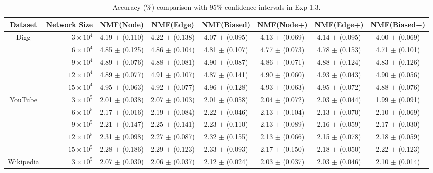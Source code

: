 \documentclass[10pt,journal,compsoc]{IEEEtran}
\newcommand{\Node}{{\sf NMF(Node)}\xspace}
\newcommand{\Edge}{{\sf NMF(Edge)}\xspace}
\newcommand{\Biased}{{\sf NMF(Biased)}\xspace}
\newcommand{\Digg}{{\sf Digg}\xspace}
\newcommand{\YouTube}{{\sf YouTube}\xspace}
\newcommand{\Wikipedia}{{\sf Wikipedia}\xspace}
\newcommand{\Nodep}{{\sf NMF(Node+)}\xspace}
\newcommand{\Edgep}{{\sf NMF(Edge+)}\xspace}
\newcommand{\Biasedp}{{\sf NMF(Biased+)}\xspace}
\begin{document}
\begin{table}
\caption{Accuracy (\%) comparison with 95\% confidence intervals in Exp-1.3.}
\label{tab_accuracy_2}
\vspace{-2ex}
\centering
\newcommand{\tabincell}[2]{\begin{tabular}{@{}#1@{}}#2\end{tabular}}
\begin{tabular}{c|r|c|c|c|c|c|c}
\hline \hline Dataset  & Network Size &  \Node & \Edge & \Biased & \Nodep & \Edgep & \Biasedp   \\
\hline
\multirow{5}{*}{\Digg}
 & $3 \times 10^4 $ & 4.19 $\pm$ (0.110) & 4.22 $\pm$ (0.138) & 4.07 $\pm$ (0.095) & 4.13 $\pm$ (0.069) & 4.14 $\pm$ (0.095) & 4.00 $\pm$ (0.069) \\
 & $6 \times 10^4 $ & 4.85 $\pm$ (0.125) & 4.86 $\pm$ (0.104) & 4.81 $\pm$ (0.107) & 4.77 $\pm$ (0.073) & 4.78 $\pm$ (0.153) & 4.71 $\pm$ (0.101)  \\
 & $9 \times 10^4 $ & 4.89 $\pm$ (0.076) & 4.88 $\pm$ (0.081) & 4.90 $\pm$ (0.087) & 4.86 $\pm$ (0.071) & 4.88 $\pm$ (0.124) & 4.83 $\pm$ (0.126)  \\
 & $12 \times 10^4 $ & 4.89 $\pm$ (0.077) & 4.91 $\pm$ (0.107) & 4.87 $\pm$ (0.141) & 4.90 $\pm$ (0.060) & 4.93 $\pm$ (0.043) & 4.90 $\pm$ (0.056) \\
 & $15 \times 10^4 $ & 4.95 $\pm$ (0.063) & 4.92 $\pm$ (0.077) & 4.96 $\pm$ (0.128) & 4.93 $\pm$ (0.063) & 4.95 $\pm$ (0.072) & 4.88 $\pm$ (0.076)  \\
\hline
\multirow{5}{*}{\YouTube}
 & $3 \times 10^5 $ & 2.01 $\pm$ (0.038) & 2.07 $\pm$ (0.103) & 2.01 $\pm$ (0.058) & 2.04 $\pm$ (0.072) & 2.03 $\pm$ (0.044) & 1.99 $\pm$ (0.091)  \\
 & $6 \times 10^5 $ & 2.17 $\pm$ (0.016) & 2.19 $\pm$ (0.084) & 2.22 $\pm$ (0.046) & 2.13 $\pm$ (0.104) & 2.13 $\pm$ (0.070) & 2.10 $\pm$ (0.069)  \\
 & $9 \times 10^5 $ & 2.21 $\pm$ (0.147) & 2.25 $\pm$ (0.141) & 2.23 $\pm$ (0.110) & 2.13 $\pm$ (0.089) & 2.16 $\pm$ (0.059) & 2.17 $\pm$ (0.030)  \\
 & $12 \times 10^5 $ & 2.31 $\pm$ (0.098) & 2.27 $\pm$ (0.087) & 2.32 $\pm$ (0.155) & 2.13 $\pm$ (0.066) & 2.15 $\pm$ (0.078) & 2.18 $\pm$ (0.059)  \\
 & $15 \times 10^5 $ & 2.28 $\pm$ (0.186) & 2.29 $\pm$ (0.123) & 2.33 $\pm$ (0.093) & 2.17 $\pm$ (0.150) & 2.18 $\pm$ (0.050) & 2.22 $\pm$ (0.123)  \\
\hline
\multirow{5}{*}{\Wikipedia}
 & $3 \times 10^5 $ & 2.07 $\pm$ (0.030) & 2.06 $\pm$ (0.037) & 2.12 $\pm$ (0.024) & 2.03 $\pm$ (0.037) & 2.03 $\pm$ (0.046) & 2.10 $\pm$ (0.014)  \\

\end{tabular}
\end{table}
\end{document}
